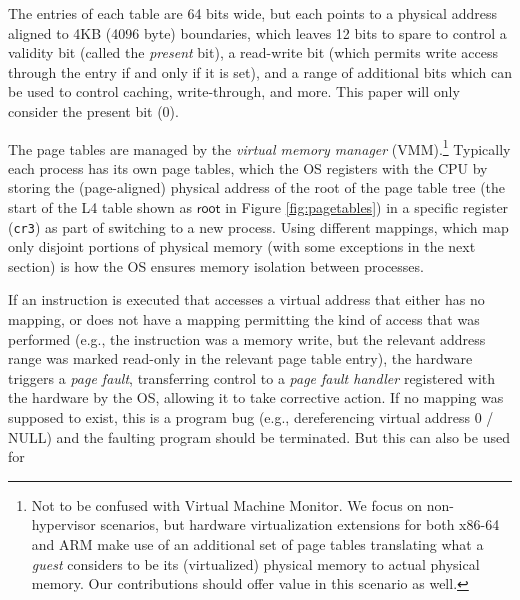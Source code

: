 The entries  of each table are 64 bits wide,
but each points to a physical address aligned to 4KB (4096 byte) boundaries, which leaves 12 bits to spare to 
control a validity bit (called the \emph{present} bit), a read-write bit (which permits write access through the entry if and only if it is set),
and a range of additional bits which can be used to control caching, write-through, and more.
This paper will only consider the present bit (0).

The page tables are managed by the  \emph{virtual memory manager} (VMM).\footnote{Not to be confused with Virtual 
Machine Monitor. We focus on non-hypervisor scenarios, but hardware virtualization extensions for both 
x86-64 and ARM make use of an additional set of page tables translating what a \emph{guest} considers to be its 
(virtualized) physical memory to actual physical memory. Our contributions should offer value in this scenario as well.}
Typically each process has its own 
page tables, which the OS registers with the CPU by storing the (page-aligned)
physical address of the root of the page table tree (the start of the L4 table shown as $\mathsf{root}$ in Figure \ref{fig:pagetables}) in a specific register (\texttt{cr3}) as part of switching to a new process. 
Using different mappings, which map only disjoint portions of physical memory (with some exceptions in the next section) 
is how the OS ensures memory isolation between processes.

If an instruction is executed that accesses a virtual address that either has no mapping, or does not have a mapping permitting 
the kind of access that was performed (e.g., the instruction was a memory write, but the relevant address range was marked read-only in
the relevant page table entry), the hardware triggers a \emph{page fault}, transferring control to a \emph{page fault handler} registered 
with the hardware by the OS, allowing it to take corrective action.
If no mapping was supposed to exist, this is a program bug (e.g., dereferencing virtual address 0 / NULL)
and the faulting program should be terminated. But this can also be used for

